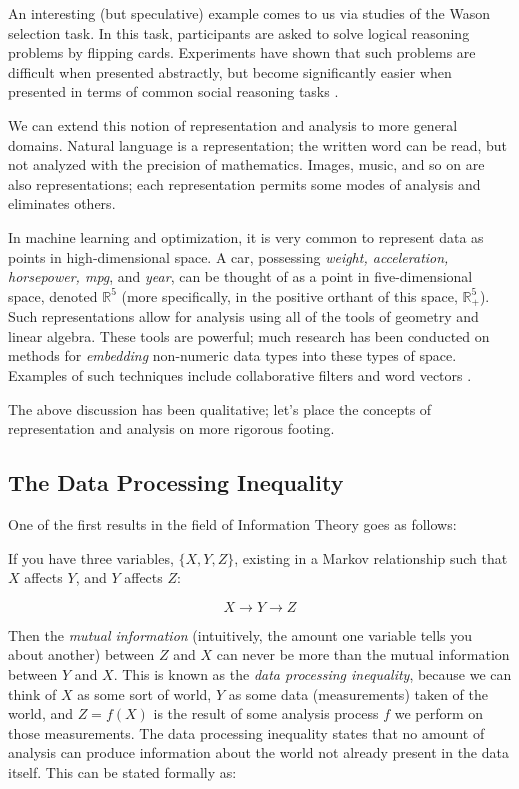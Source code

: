 An interesting (but speculative) example comes to us via studies of the Wason selection task.
In this task, participants are asked to solve logical reasoning problems by flipping cards.
Experiments have shown that such problems are difficult when presented abstractly, but become significantly easier when presented in terms of common social reasoning tasks \cite{cosmides}.

\bigskip

We can extend this notion of representation and analysis to more general domains.
Natural language is a representation; the written word can be read, but not analyzed with the precision of mathematics.
Images, music, and so on are also representations; each representation permits some modes of analysis and eliminates others.

In machine learning and optimization, it is very common to represent data as points in high-dimensional space.
A car, possessing \textit{weight, acceleration, horsepower, mpg}, and \textit{year}, can be thought of as a point in five-dimensional space, denoted $\mathbb{R}^5$ (more specifically, in the positive orthant of this space, $\mathbb{R}^5_+$).
Such representations allow for analysis using all of the tools of geometry and linear algebra.
These tools are powerful; much research has been conducted on methods for \textit{embedding} non-numeric data types into these types of space.
Examples of such techniques include collaborative filters and word vectors \cite{mikolov} \cite{koren}.

The above discussion has been qualitative; let's place the concepts of representation and analysis on more rigorous footing.


\subsection{The Data Processing Inequality}

One of the first results in the field of Information Theory goes as follows:

If you have three variables, $\{X, Y, Z\}$, existing in a Markov relationship such that $X$ affects $Y$, and $Y$ affects $Z$:

\[
X \rightarrow Y \rightarrow Z
\]

Then the \textit{mutual information} (intuitively, the amount one variable tells you about another) between $Z$ and $X$ can never be more than the mutual information between $Y$ and $X$.
This is known as the \textit{data processing inequality}\cite{cover}, because we can think of $X$ as some sort of  world, $Y$ as some data (measurements) taken of the world, and $Z = f(X)$ is the result of some analysis process $f$ we perform on those measurements.
The data processing inequality states that no amount of analysis can produce information about the world not already present in the data itself. This can be stated formally as:

